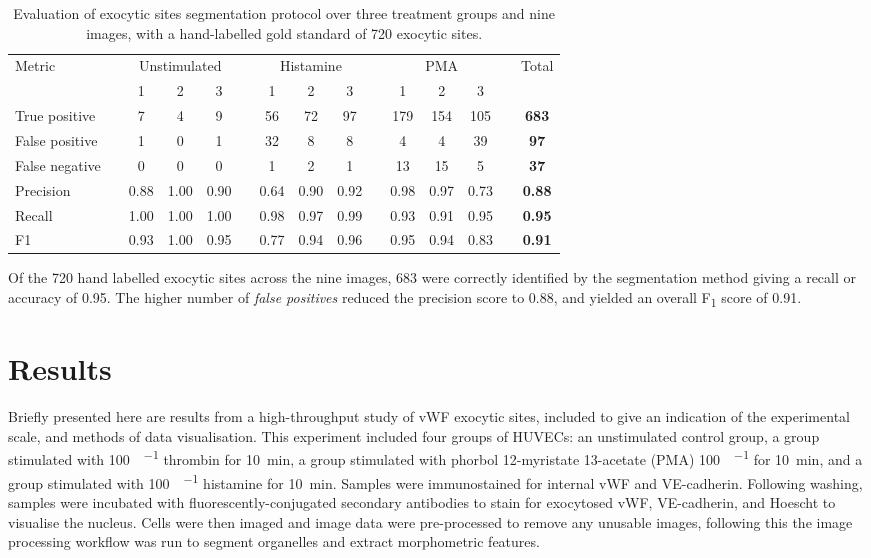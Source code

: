 \begin{table}[htbp!]
\footnotesize
\caption[Exocytic sites segmentation evaluation]{Evaluation of exocytic sites segmentation protocol over three treatment groups and nine images, with a hand-labelled gold standard of 720 exocytic sites.}
\centering
\label{table:endothelial_morphometry:exocytic_sites_performance}
\begin{tabular}{l c c c c c c c c c c c c c >{\bfseries}c}
\toprule
\multirow{2}{*}{Metric} & & \multicolumn{3}{c}{Unstimulated} & & \multicolumn{3}{c}{Histamine} & & \multicolumn{3}{c}{PMA} & & \multirow{2}{*}{Total} \\
\cmidrule{3-5}
\cmidrule{7-9}
\cmidrule{11-13}
	& & 1 & 2 & 3 & & 1 & 2 & 3 & & 1 & 2 & 3 & &\\
\midrule
	True positive  & & 7 & 4 & 9 & & 56 & 72 & 97 & & 179 & 154 & 105 & & 683 \\
	False positive & & 1 & 0 & 1 & & 32 & 8  & 8  & & 4   & 4   & 39  & & 97  \\
	False negative & & 0 & 0 & 0 & & 1  & 2  & 1  & & 13  & 15  & 5   & & 37  \\
\midrule
	Precision      & & 0.88 & 1.00 & 0.90 & & 0.64 & 0.90 & 0.92 & & 0.98 & 0.97 & 0.73 & & 0.88 \\
	Recall         & & 1.00 & 1.00 & 1.00 & & 0.98 & 0.97 & 0.99 & & 0.93 & 0.91 & 0.95 & & 0.95 \\
	F1             & & 0.93 & 1.00 & 0.95 & & 0.77 & 0.94 & 0.96 & & 0.95 & 0.94 & 0.83 & & 0.91 \\
\bottomrule
\end{tabular}
\end{table}

Of the 720 hand labelled exocytic sites across the nine images, 683 were correctly identified by the segmentation method giving a recall or accuracy of 0.95. The higher number of \emph{false positives} reduced the precision score to 0.88, and yielded an overall F\textsubscript{1} score of 0.91.

\section{Results}
\label{endothelial_morphometry:results}
Briefly presented here are results from a high-throughput study of vWF exocytic sites, included to give an indication of the experimental scale, and methods of data visualisation. This experiment included four groups of HUVECs: an unstimulated control group, a group stimulated with \SI{100}{\nanogram\per\millilitre} thrombin for \SI{10}{\minute}, a group stimulated with phorbol 12-myristate 13-acetate (PMA) \SI{100}{\nanogram\per\millilitre} for \SI{10}{\minute}, and a group stimulated with \SI{100}{\nanogram\per\millilitre} histamine for \SI{10}{\minute}. Samples were immunostained for internal vWF and VE-cadherin. Following washing, samples were incubated with fluorescently-conjugated secondary antibodies to stain for exocytosed vWF, VE-cadherin, and Hoescht to visualise the nucleus. Cells were then imaged and image data were pre-processed to remove any unusable images, following this the image processing workflow was run to segment organelles and  extract morphometric features.

